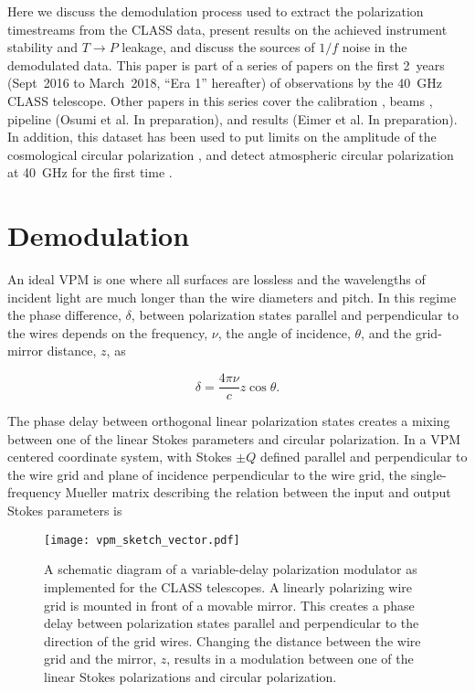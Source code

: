 \documentclass[twocolumn, tighten, numberedappendix, twocolappendix]{aastex63}
\begin{document}
Here we discuss the demodulation process used to extract the polarization timestreams from the CLASS data, present results on the achieved instrument stability and $T\rightarrow P$ leakage, and discuss the sources of $1/f$ noise in the demodulated data. This paper is part of a series of papers on the first 2~years (Sept~2016 to March~2018, ``Era 1'' hereafter) of observations by the 40~GHz CLASS telescope. Other papers in this series cover the calibration \citep{appe19}, beams \citep{xu20}, pipeline (Osumi et al. In preparation), and results (Eimer et al. In preparation). In addition, this dataset has been used to put limits on the amplitude of the cosmological circular polarization \citep{padi20}, and detect atmospheric circular polarization at 40~GHz for the first time \citep{petr20}.


\section{\label{sec:demod}Demodulation}

An ideal VPM is one where all surfaces are lossless and the wavelengths of incident light are much longer than the wire diameters and pitch. In this regime the phase difference, $\delta$, between polarization states parallel and perpendicular to the wires depends on the frequency, $\nu$, the angle of incidence, $\theta$, and the grid-mirror distance, $z$, as

\begin{equation}
    \delta = \frac{4\pi \nu}{c} z \cos \theta.
\end{equation}

\noindent The phase delay between orthogonal linear polarization states creates a mixing between one of the linear Stokes parameters and circular polarization. In a $\mathrm{VPM}$ centered coordinate system, with Stokes $\pm Q$ defined parallel and perpendicular to the wire grid and plane of incidence perpendicular to the wire grid, the single-frequency Mueller matrix \citep{hecht2012optics} describing the relation between the input and output Stokes parameters is

\begin{figure}
\texttt{[image: vpm\_sketch\_vector.pdf]}
\caption{\label{fig:vpm_sketch} A schematic diagram of a variable-delay polarization modulator as implemented for the CLASS telescopes. A linearly polarizing wire grid is mounted in front of a movable mirror. This creates a phase delay between polarization states parallel and perpendicular to the direction of the grid wires. Changing the distance between the wire grid and the mirror, $z$, results in a modulation between one of the linear Stokes polarizations and circular polarization.}
\end{figure}
\end{document}
